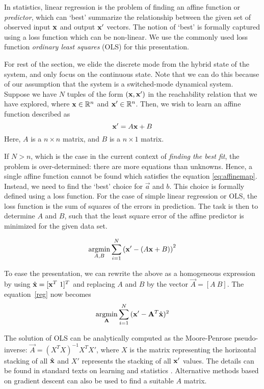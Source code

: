 In statistics, linear regression is the problem of finding an affine
function or \textit{predictor}, which can `best' summarize the
relationship between the given set of observed input $\mathbf{x}$ and output
$\mathbf{x}'$ vectors. The notion of `best' is formally captured using a loss
function which can be non-linear. We use the commonly used loss
function \textit{ordinary least squares} (OLS) for this presentation.

For rest of the section, we elide the discrete mode from the hybrid
state of the system, and only focus on the continuous state. Note that
we can do this because of our assumption that the system is a
switched-mode dynamical system.  Suppose we have $N$ tuples of the
form $(\mathbf{x},\mathbf{x}')$ in the reachability relation that we have explored,
where $\mathbf{x}\in\mathbb{R}^n$ and $\mathbf{x}'\in\mathbb{R}^n$. Then, we wish to learn an
affine function described as 
\begin{equation}
\label{eq:affinemap}
\mathbf{x}' = A\mathbf{x} + B
\end{equation}
Here, $A$ is a $n\times n$ matrix, and $B$ is a $n\times 1$ matrix.


If $N>n$, which is the case in the current context of \textit{finding
the best fit}, the problem is over-determined: there are more
equations than unknowns. Hence, a single affine function cannot be
found which satisfies the equation \eqref{eq:affinemap}. Instead, we
need to find the `best' choice for $\vec{a}$ and $b$. This choice is
formally defined using a loss function. For the case of simple linear
regression or OLS, the loss function is the sum of squares of the
errors in prediction.  The task is then to determine $A$ and $B$, such
that the least square error of the affine predictor is minimized for
the given data set.

\begin{equation}
    \operatornamewithlimits{argmin}_{A,B}\displaystyle\sum_{i=1}^{N}{\left(\x' - (A\x + B)\right)^2}
\label{reg}
\end{equation}

To ease the presentation, we can rewrite the above as a homogeneous
expression by using $\hat{\x} = [\x^T\ 1]^T$ and replacing $A$ and $B$ by the vector
$\vec{A} = [A\ B]$. The equation~\ref{reg} now becomes
\[
\operatornamewithlimits{argmin}_{\vec{A}}\displaystyle\sum_{i=1}^{N}{(\x' - \vec{A}^T \hat{\x})^2}
\]

The solution of OLS can be analytically computed as the Moore-Penrose
pseudo-inverse: $\vec{A} = (X^TX)^{-1}X^T X'$, where $X$ is the matrix
representing the horizontal stacking of all $\hat{\mathbf{x}}$ and $X'$
represents the stacking of all $\mathbf{x}'$ values.  The details can be found
in standard texts on learning and statistics
\cite{friedman2001elements}. Alternative methods based on gradient
descent can also be used to find a suitable $A$ matrix.

